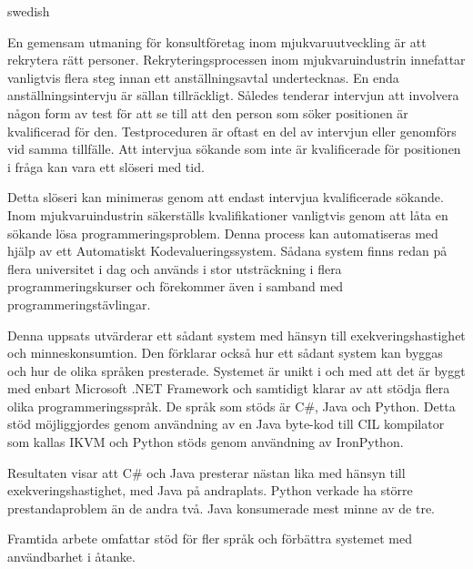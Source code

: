 \begin{foreignabstract}{swedish}

En gemensam utmaning för konsultföretag inom mjukvaruutveckling är att rekrytera rätt personer. Rekryteringsprocessen inom mjukvaruindustrin innefattar vanligtvis flera steg innan ett anställningsavtal undertecknas. En enda anställningsintervju är sällan tillräckligt. Således tenderar intervjun att involvera någon form av test för att se till att den person som söker positionen är kvalificerad för den. Testproceduren är oftast en del av intervjun eller genomförs vid samma tillfälle. Att intervjua sökande som inte är kvalificerade för positionen i fråga kan vara ett slöseri med tid.

Detta slöseri kan minimeras genom att endast intervjua kvalificerade sökande. Inom mjukvaruindustrin säkerställs kvalifikationer vanligtvis genom att låta en sökande lösa programmeringsproblem. Denna process kan automatiseras med hjälp av ett Automatiskt Kodevalueringssystem. Sådana system finns redan på flera universitet i dag och används i stor utsträckning i flera programmeringskurser och förekommer även i samband med programmeringstävlingar.

Denna uppsats utvärderar ett sådant system med hänsyn till exekveringshastighet och minneskonsumtion. Den förklarar också hur ett sådant system kan byggas och hur de olika språken presterade. Systemet är unikt i och med att det är byggt med enbart Microsoft .NET Framework och samtidigt klarar av att stödja flera olika programmeringsspråk. De språk som stöds är C\#, Java och Python. Detta stöd möjliggjordes genom användning av en Java byte-kod till CIL kompilator som kallas IKVM och Python stöds genom användning av IronPython.

Resultaten visar att C\# och Java presterar nästan lika med hänsyn till exekveringshastighet, med Java på andraplats. Python verkade ha större prestandaproblem än de andra två. Java konsumerade mest minne av de tre.

Framtida arbete omfattar stöd för fler språk och förbättra systemet med användbarhet i åtanke.

\end{foreignabstract}